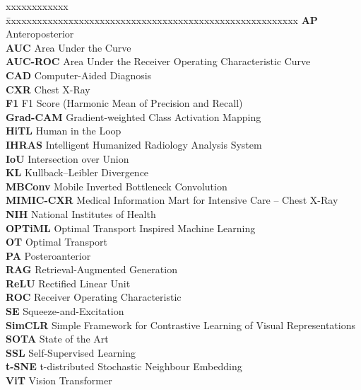 \documentclass[BTech]{iiitdmdiss}
\begin{document}


\abbreviations
\noindent
\begin{tabbing}
xxxxxxxxxxxx \= xxxxxxxxxxxxxxxxxxxxxxxxxxxxxxxxxxxxxxxxxxxxxxxxxxxxxxxx \kill
\textbf{AP}         \> Anteroposterior\\
\textbf{AUC}        \> Area Under the Curve\\
\textbf{AUC-ROC}    \> Area Under the Receiver Operating Characteristic Curve\\
\textbf{CAD}        \> Computer-Aided Diagnosis\\
\textbf{CXR}        \> Chest X-Ray\\
\textbf{F1}         \> F1 Score (Harmonic Mean of Precision and Recall)\\
\textbf{Grad-CAM}   \> Gradient-weighted Class Activation Mapping\\
\textbf{HiTL}       \> Human in the Loop\\
\textbf{IHRAS}      \> Intelligent Humanized Radiology Analysis System\\
\textbf{IoU}        \> Intersection over Union\\
\textbf{KL}         \> Kullback--Leibler Divergence\\
\textbf{MBConv}     \> Mobile Inverted Bottleneck Convolution\\
\textbf{MIMIC-CXR}  \> Medical Information Mart for Intensive Care -- Chest X-Ray\\
\textbf{NIH}        \> National Institutes of Health\\
\textbf{OPTiML}     \> Optimal Transport Inspired Machine Learning\\
\textbf{OT}         \> Optimal Transport\\
\textbf{PA}         \> Posteroanterior\\
\textbf{RAG}        \> Retrieval-Augmented Generation\\
\textbf{ReLU}       \> Rectified Linear Unit\\
\textbf{ROC}        \> Receiver Operating Characteristic\\
\textbf{SE}         \> Squeeze-and-Excitation\\
\textbf{SimCLR}     \> Simple Framework for Contrastive Learning of Visual Representations\\
\textbf{SOTA}       \> State of the Art\\
\textbf{SSL}        \> Self-Supervised Learning\\
\textbf{t-SNE}      \> t-distributed Stochastic Neighbour Embedding\\
\textbf{ViT}        \> Vision Transformer\\
\end{tabbing}
\end{document}
